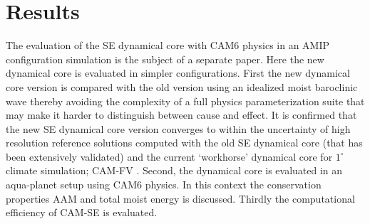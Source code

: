\documentclass{agujournal}
\begin{document}
{%
\section{Results}\label{sec:results}
The evaluation of the SE dynamical core with CAM6 physics in an AMIP configuration simulation is the subject of a separate paper. Here the new dynamical core is evaluated in simpler configurations. First the new dynamical core version is compared with the old version using an idealized moist baroclinic wave thereby avoiding the complexity of a full physics parameterization suite that may make it harder to distinguish between cause and effect. It is confirmed that the new SE dynamical core version converges to within the uncertainty of high resolution reference solutions computed with the old SE dynamical core (that has been extensively validated) and the current `workhorse' dynamical core for $1^\circ$ climate simulation; CAM-FV \citep[finite-volume][]{L2004MWR}. Second, the dynamical core is evaluated in an aqua-planet setup \citep{NH2000ASL,WetAl2012NCAR,MWO2016JAMES} using CAM6 physics. In this context the conservation properties AAM and total moist energy is discussed. Thirdly the computational efficiency of CAM-SE is evaluated.
}
\end{document}
